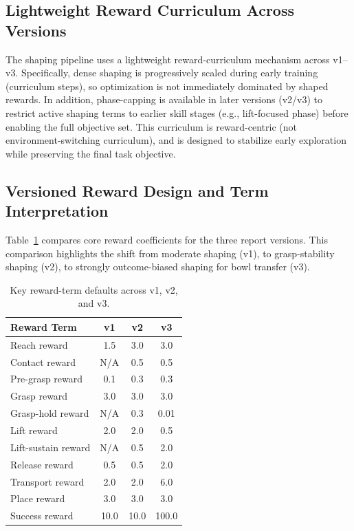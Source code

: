 \documentclass[11pt]{article}
\begin{document}
\subsection{Lightweight Reward Curriculum Across Versions}
The shaping pipeline uses a lightweight reward-curriculum mechanism across v1--v3.
Specifically, dense shaping is progressively scaled during early training (curriculum
steps), so optimization is not immediately dominated by shaped rewards. In addition,
phase-capping is available in later versions (v2/v3) to restrict active shaping
terms to earlier skill stages (e.g., lift-focused phase) before enabling the full
objective set. This curriculum is reward-centric (not environment-switching
curriculum), and is designed to stabilize early exploration while preserving the
final task objective.

\subsection{Versioned Reward Design and Term Interpretation}
Table~\ref{tab:rewards} compares core reward coefficients for the three report
versions. This comparison highlights the shift from moderate shaping (v1), to
grasp-stability shaping (v2), to strongly outcome-biased shaping for bowl transfer
(v3).

\begin{table}[h]
\centering
\caption{Key reward-term defaults across v1, v2, and v3.}
\label{tab:rewards}
\begin{tabular}{lccc}
\toprule
Reward Term & v1 & v2 & v3 \\
\midrule
Reach reward         & 1.5 & 3.0 & 3.0 \\
Contact reward       & N/A & 0.5 & 0.5 \\
Pre-grasp reward     & 0.1 & 0.3 & 0.3 \\
Grasp reward         & 3.0 & 3.0 & 3.0 \\
Grasp-hold reward    & N/A & 0.3 & 0.01 \\
Lift reward          & 2.0 & 2.0 & 0.5 \\
Lift-sustain reward  & N/A & 0.5 & 2.0 \\
Release reward       & 0.5 & 0.5 & 2.0 \\
Transport reward     & 2.0 & 2.0 & 6.0 \\
Place reward         & 3.0 & 3.0 & 3.0 \\
Success reward       & 10.0 & 10.0 & 100.0 \\
\bottomrule
\end{tabular}
\end{table}
\end{document}
